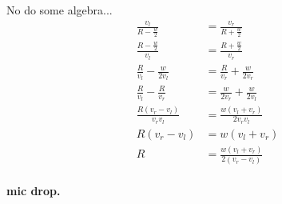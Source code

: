 \documentclass{article}
\begin{document}
No do some algebra...
\begin{align*}
  \frac{v_l}{R-\frac{w}{2}} &= \frac{v_r}{R + \frac{w}{2}} \\[1em]
  \frac{R-\frac{w}{2}}{v_l} &= \frac{R + \frac{w}{2}}{v_r} \\[1em]
  \frac{R}{v_l}-\frac{w}{2v_l} &= \frac{R}{v_r} + \frac{w}{2v_r} \\[1em]
  \frac{R}{v_l}-\frac{R}{v_r} &= \frac{w}{2v_r}+\frac{w}{2v_l} \\[1em]
  \frac{R(v_r-v_l)}{v_rv_l} &= \frac{w(v_l+v_r)}{2v_rv_l} \\[1em]
  R(v_r-v_l) &= w(v_l+v_r) \\[1em]
  R &= \frac{w(v_l+v_r)}{2(v_r-v_l)} \\[1em]
\end{align*}

\textbf{mic drop.}
\end{document}
